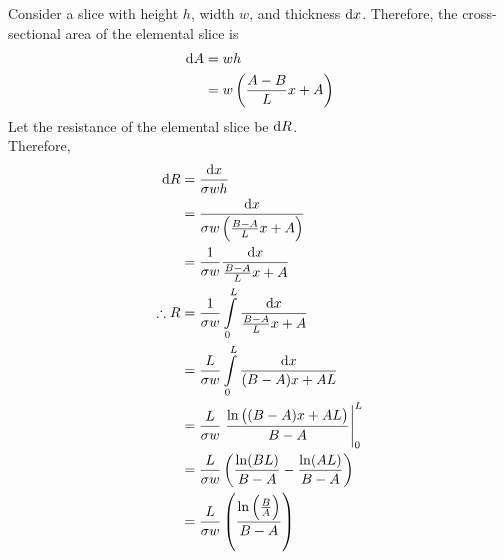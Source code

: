 \documentclass[fleqn, a4paper, 11pt, oneside]{amsart}
\theoremstyle{definition}
\theoremstyle{theorem}
\begin{document}
\begin{solution}
	Consider a slice with height $h$, width $w$, and thickness $\dif x$.
	Therefore, the cross-sectional area of the elemental slice is
	\begin{align*}
		\dif A & = w h \\
                       & = w \left( \frac{A - B}{L} x + A \right)
	\end{align*}
	Let the resistance of the elemental slice be $\dif R$.\\
	Therefore,
	\begin{align*}
		\dif R       & = \frac{\dif x}{\sigma w h}                                                                 \\
                             & = \frac{\dif x}{\sigma w \left( \frac{B - A}{L} x + A \right)}                              \\
                             & = \frac{1}{\sigma w} \frac{\dif x}{\frac{B - A}{L} x + A}                                   \\
		\therefore R & = \frac{1}{\sigma w} \int\limits_{0}^{L} \frac{\dif x}{\frac{B - A}{L} x + A}               \\
                             & = \frac{L}{\sigma w} \int\limits_{0}^{L} \frac{\dif x}{(B - A) x + A L}                     \\
                             & = \frac{L}{\sigma w} \left. \frac{\ln\left( (B - A) x + A L \right)}{B - A} \right|_{0}^{L} \\
                             & = \frac{L}{\sigma w} \left( \frac{\ln(B L)}{B - A} - \frac{\ln(A L)}{B - A} \right)         \\
                             & = \frac{L}{\sigma w} \left( \frac{\ln\left( \frac{B}{A} \right)}{B - A} \right)
	\end{align*}
\end{solution}
\end{document}
